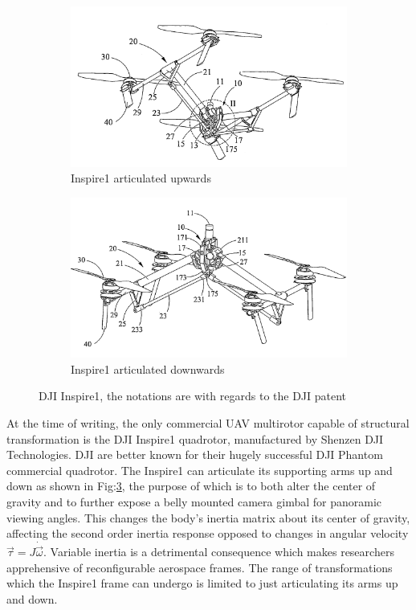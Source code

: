\begin{figure}[hbtp]
\centering
\begin{subfigure}{.5\textwidth}
\centering
\includegraphics[width=\textwidth]{figs/dji-inspire1}
\caption{Inspire1 articulated upwards}
\label{fig:inspireup}
\end{subfigure}%
\begin{subfigure}{.5\textwidth}
\centering
\includegraphics[width=\textwidth]{figs/dji-inspire2}
\caption{Inspire1 articulated downwards}
\label{fig:inspiredown}
\end{subfigure}
\caption{DJI Inspire1, the notations are with regards to the DJI patent \cite{djinspire}}
\label{fig:inspire1}
\end{figure}
At the time of writing, the only commercial UAV multirotor capable of structural transformation is the DJI Inspire1 quadrotor\cite{inspire}, manufactured by Shenzen DJI Technologies. DJI are better known for their hugely successful DJI Phantom commercial quadrotor\cite{phantom}. The Inspire1 can articulate its supporting arms up and down as shown in Fig:\ref{fig:inspire1}, the purpose of which is to both alter the center of gravity and to further expose a belly mounted camera gimbal for panoramic viewing angles. This changes the body's inertia matrix about its center of gravity, affecting the second order inertia response opposed to changes in angular velocity $\vec{\tau}=J\dot{\vec{\omega}}$. Variable inertia is a detrimental consequence which makes researchers apprehensive of reconfigurable aerospace frames. The range of transformations which the Inspire1 frame can undergo is limited to just articulating its arms up and down.
